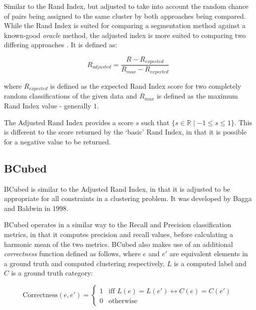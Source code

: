 \documentclass{uvamscse}	%
\begin{document}
Similar to the Rand Index, but adjusted to take into account the random chance of pairs being assigned to the same cluster by both approaches being compared. While the Rand Index is suited for comparing a segmentation method against a known-good \emph{oracle} method, the adjusted index is more suited to comparing two differing approaches \cite{Matteson2012}. It is defined as:
	
	\begin{equation}
	    R_{adjusted} = \frac{R - R_{expected}}{R_{max} - R_{expected}}
	\end{equation}
	
	where $R_{expected}$ is defined as the expected Rand Index score for two completely random classifications of the given data and $R_{max}$ is defined as the maximum Rand Index value - generally $1$.
	
	The Adjusted Rand Index provides a score $s$ such that $ \{s\in\mathbb{R} \mid -1\leq s \leq 1\} $. This is different to the score returned by the `basic' Rand Index, in that it is possible for a negative value to be returned.
		
\subsection{BCubed}
		
BCubed is similar to the Adjusted Rand Index, in that it is adjusted to be appropriate for all constraints in a clustering problem. It was developed by Bagga and Baldwin in 1998.
	
	BCubed operates in a similar way to the Recall and Precision classification metrics, in that it computes precision and recall values, before calculating a harmonic mean of the two metrics. BCubed also makes use of an additional \emph{correctness} function defined as follows, where $e$ and $e'$ are equivalent elements in a ground truth and computed clustering respectively, $L$ is a computed label and $C$ is a ground truth category:
	
	\begin{equation}
	\label{eqn:correctness}
	    \text{Correctness}(e,e') = 
	    \begin{cases}
	        1 & \text{iff $L(e) = L(e') \leftrightarrow C(e) = C(e')$}\\
	        0 & \text{otherwise}
	    \end{cases}
	\end{equation}
	
\end{document}
